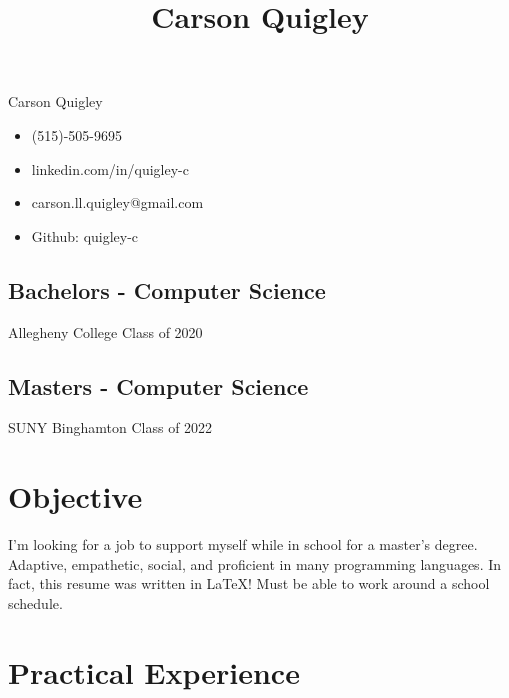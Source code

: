 \documentclass[12pt]{article}
\title{Carson Quigley}
\date{}
\begin{document}
\pagestyle{empty}

\begin{multicols}{3}

\begingroup
    \LARGE Carson Quigley\\[0em]
\endgroup

\vfill\null

\begin{itemize}
    \item[] (515)-505-9695
    \item[] linkedin.com/in/quigley-c

\vfill\null

    \item[] carson.ll.quigley@gmail.com
    \item[] Github: quigley-c

\vfill\null

\end{itemize}
\end{multicols}

\vspace{-1.5em}
\noindent\makebox[\linewidth]{\rule{\paperwidth}{0.4pt}}

\begingroup
\centering
\begin{multicols}{2}
\subsection*{Bachelors - Computer Science}
Allegheny College Class of 2020

\subsection*{Masters - Computer Science}
SUNY Binghamton Class of 2022

\end{multicols}
\endgroup

\begingroup
\centering
\section*{Objective}
I'm looking for a job to support myself while in school for a master's degree. 
Adaptive, empathetic, social, and proficient in many programming languages. 
In fact, this resume was written in LaTeX! Must be able to work around a school schedule.
\endgroup


\section*{Practical Experience}
\end{document}
